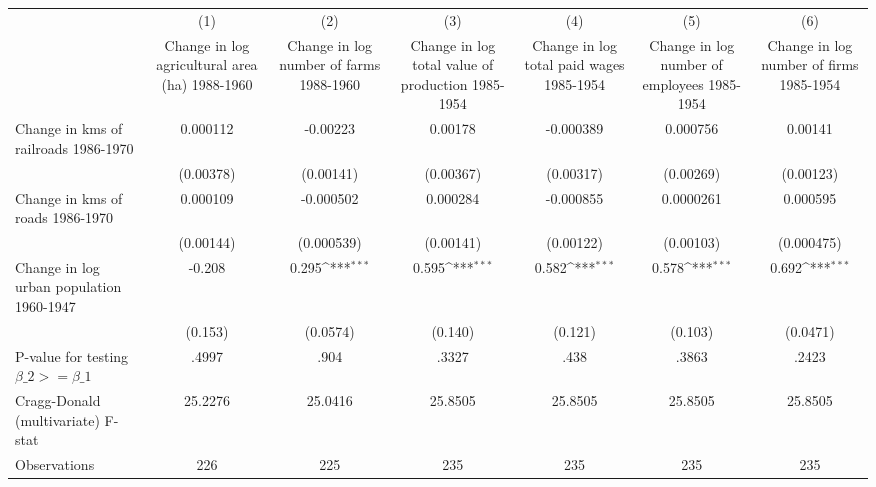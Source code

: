 {
\def\sym#1{\ifmmode^{#1}\else\(^{#1}\)\fi}
\begin{tabular}{l*{6}{c}}
\hline\hline
                &\multicolumn{1}{c}{(1)}&\multicolumn{1}{c}{(2)}&\multicolumn{1}{c}{(3)}&\multicolumn{1}{c}{(4)}&\multicolumn{1}{c}{(5)}&\multicolumn{1}{c}{(6)}\\
                &\multicolumn{1}{c}{Change in log agricultural area (ha) 1988-1960}&\multicolumn{1}{c}{Change in log number of farms 1988-1960}&\multicolumn{1}{c}{Change in log total value of production 1985-1954}&\multicolumn{1}{c}{Change in log total paid wages 1985-1954}&\multicolumn{1}{c}{Change in log number of employees 1985-1954}&\multicolumn{1}{c}{Change in log number of firms 1985-1954}\\
\hline
Change in kms of railroads 1986-1970& 0.000112         & -0.00223         &  0.00178         &-0.000389         & 0.000756         &  0.00141         \\
                &(0.00378)         &(0.00141)         &(0.00367)         &(0.00317)         &(0.00269)         &(0.00123)         \\
[1em]
Change in kms of roads 1986-1970& 0.000109         &-0.000502         & 0.000284         &-0.000855         &0.0000261         & 0.000595         \\
                &(0.00144)         &(0.000539)         &(0.00141)         &(0.00122)         &(0.00103)         &(0.000475)         \\
[1em]
Change in log urban population 1960-1947&   -0.208         &    0.295\sym{***}&    0.595\sym{***}&    0.582\sym{***}&    0.578\sym{***}&    0.692\sym{***}\\
                &  (0.153)         & (0.0574)         &  (0.140)         &  (0.121)         &  (0.103)         & (0.0471)         \\
\hline
P-value for testing $\beta\_{2} >= \beta\_{1}$&    .4997         &     .904         &    .3327         &     .438         &    .3863         &    .2423         \\
Cragg-Donald (multivariate) F-stat&  25.2276         &  25.0416         &  25.8505         &  25.8505         &  25.8505         &  25.8505         \\
Observations    &      226         &      225         &      235         &      235         &      235         &      235         \\
\hline\hline
\end{tabular}
}
